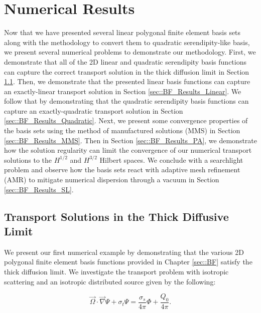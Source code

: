 \section{Numerical Results}
\label{sec::BF_Results}

Now that we have presented several linear polygonal finite element basis sets along with the methodology to convert them to quadratic serendipity-like basis, we present several numerical problems to demonstrate our methodology. First, we demonstrate that all of the 2D linear and quadratic serendipity basis functions can capture the correct transport solution in the thick diffusion limit in Section \ref{sec::DSA_Results_TDL}. Then, we demonstrate that the presented linear basis functions can capture an exactly-linear transport solution in Section \ref{sec::BF_Results_Linear}. We follow that by demonstrating that the quadratic serendipity basis functions can capture an exactly-quadratic transport solution in Section \ref{sec::BF_Results_Quadratic}. Next, we present some convergence properties of the basis sets using the method of manufactured solutions (MMS) in Section \ref{sec::BF_Results_MMS}. Then in Section \ref{sec::BF_Results_PA}, we demonstrate how the solution regularity can limit the convergence of our numerical transport solutions to the $H^{1/2}$ and $H^{3/2}$ Hilbert spaces. We conclude with a searchlight problem and observe how the basis sets react with adaptive mesh refinement (AMR) to mitigate numerical dispersion through a vacuum in Section \ref{sec::BF_Results_SL}.

\subsection{Transport Solutions in the Thick Diffusive Limit}
\label{sec::DSA_Results_TDL}

We present our first numerical example by demonstrating that the various 2D polygonal finite element basis functions provided in Chapter \ref{sec::BF} satisfy the thick diffusion limit. We investigate the transport problem with isotropic scattering and an isotropic distributed source given by the following:

\begin{equation}
\label{eq::BF_Results_TDL_trans_eq}
\vec{\Omega} \cdot \vec{\nabla} \Psi + \sigma_t \Psi =   \frac{\sigma_s}{4 \pi} \Phi +  \frac{Q_0}{4 \pi}.
\end{equation}

